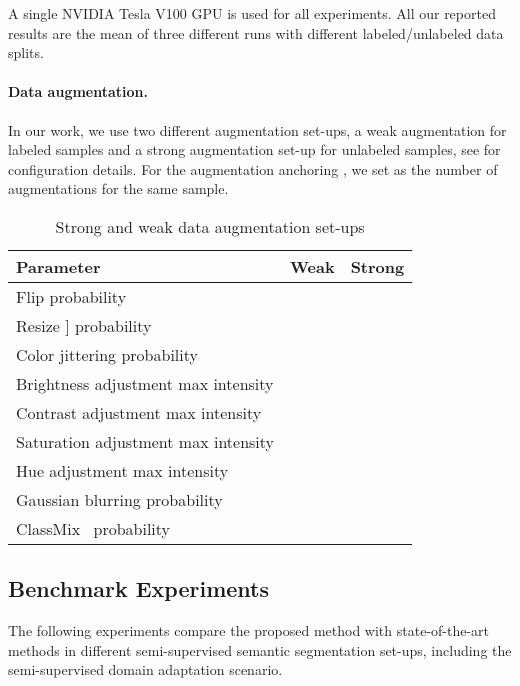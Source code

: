 \documentclass[10pt,twocolumn,letterpaper]{article}
\begin{document}
A single NVIDIA Tesla V100 GPU is used for all experiments. All our reported results are the mean of three different runs with different labeled/unlabeled data splits.
\vspace{5mm}

\paragraph{Data augmentation.}
In our work, we use two different augmentation set-ups, a weak augmentation for labeled samples and a strong augmentation set-up for unlabeled samples, see  for configuration details.
For the augmentation anchoring , we set  as the number of augmentations for the same sample. 

\begin{table}[ht]
    \caption{Strong and weak data augmentation set-ups}
    \centering
    \begin{tabular}{l c l} \toprule
        Parameter & Weak & Strong \\ \midrule
        Flip probability &  &  \\
        Resize ] probability  &  & \\
        Color jittering probability &  &  \\
        Brightness adjustment max intensity  &  &  \\
        Contrast adjustment max intensity &  & \\
        Saturation adjustment max intensity  &   &  \\
        Hue adjustment max intensity  &  & \\
        Gaussian blurring probability  &  &  \\
        ClassMix~\cite{olsson2021classmix} probability  &  &  \\
\bottomrule
    \end{tabular} 
    \label{tab:transformation_distributions}\vspace{5mm}

\end{table}

\subsection{Benchmark Experiments}

The following experiments compare the proposed method with state-of-the-art methods in different semi-supervised semantic segmentation set-ups, including the semi-supervised domain adaptation scenario. 
\end{document}
